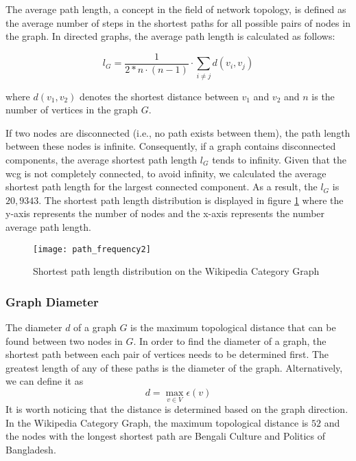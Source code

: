 The average path length, a concept in the field of network topology, is defined as the average number of steps in the shortest paths for all possible pairs of nodes in the graph. In directed graphs, the average path length is calculated as follows:

\begin{equation}
l_{G}={\frac  {1}{2 * n\cdot (n-1)}}\cdot \sum _{{i\neq j}}d(v_{i},v_{j})
\end{equation}

where $d(v_{1},v_{2})$ denotes the shortest distance between $v_1$ and $v_2$ and $n$ is the number of vertices in the graph $G$. 

If two nodes are disconnected (i.e., no path exists between them), the path length between these nodes is infinite. Consequently, if a graph contains disconnected components, the average shortest path length $l_G$ tends to infinity. 
Given that the \gls{wcg} is not completely connected, to avoid infinity, we calculated the average shortest path length for the largest connected component. As a result, the $l_G$ is $20,9343$. The shortest path length distribution is displayed in figure \ref{fig:path-distribution} where the y-axis represents the number of nodes and the x-axis represents the number average path length.



\begin{figure}[H]
  \texttt{[image: path\_frequency2]}
  \caption{Shortest path length distribution on the Wikipedia Category Graph}
  \label{fig:path-distribution}
\end{figure}


\subsubsection{\hspace*{3pt} Graph Diameter}

The diameter $d$ of a graph $G$ is the maximum topological distance that can be found between two nodes in $G$. In order to find the diameter of a graph, the shortest path between each pair of vertices needs to be determined first. The greatest length of any of these paths is the diameter of the graph. Alternatively, we can define it as 
\begin{equation}
d=\max _{v\in V}\epsilon (v)
\end{equation}
It is worth noticing that the distance is determined based on the graph direction. In the Wikipedia Category Graph, the maximum topological distance is $52$ and the nodes with the longest shortest path are Bengali Culture and Politics of Bangladesh. 


